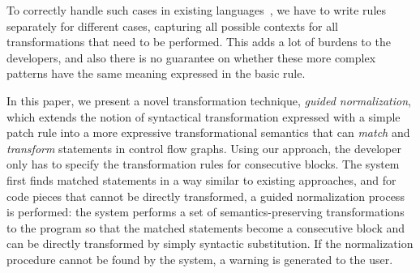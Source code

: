 \documentclass[letterpaper, USenglish]{lipics-v2016}
\theoremstyle{plain}
\begin{document}
To correctly handle such cases in existing
languages~\cite{DBLP:conf/eurosys/PadioleauLHM08,Bravenboer:2008:SLT:1385689.1385715,Cordy:2006:TST:1149670.1149672}, we have to write rules separately for different cases, capturing all possible
contexts for all transformations that need to
be performed. This adds a lot of burdens to the developers, and also
there is no guarantee on whether these more complex patterns have the same meaning expressed in the basic rule. 

In this paper, we present a novel transformation technique,
\emph{guided normalization}, which extends the notion of syntactical
transformation expressed with a simple patch rule into a more
expressive transformational semantics that can \emph{match} and
\emph{transform} statements in control flow graphs. Using our
approach, the developer only has to specify the transformation rules
for consecutive blocks. The system first finds matched statements in a
way similar to existing approaches, and for code pieces that cannot be
directly transformed, a guided normalization process is performed: the
system performs a set of semantics-preserving transformations to the
program so that the matched statements become a consecutive block and
can be directly transformed by simply syntactic substitution. If the normalization procedure cannot be found by the system, a warning is generated to the user.
\end{document}
